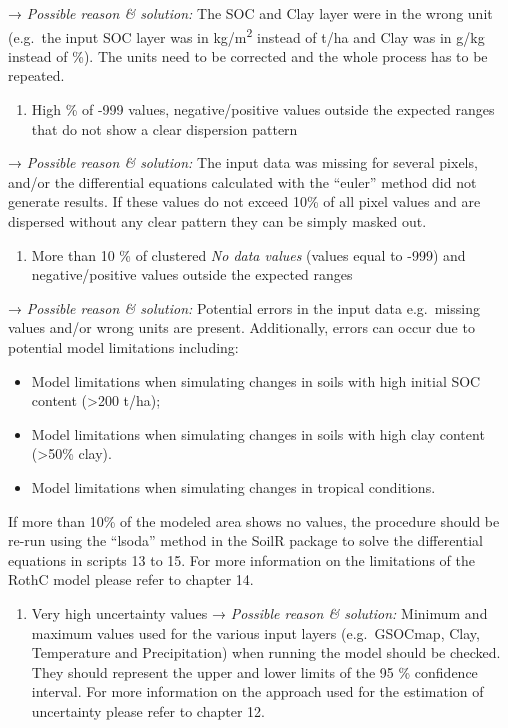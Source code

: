 \documentclass[
  10pt,
  b5paper,
]{book}
\providecommand{\tightlist}{%
  \setlength{\itemsep}{0pt}\setlength{\parskip}{0pt}}
\begin{document}
→ \emph{Possible reason \& solution:} The SOC and Clay layer were in the wrong unit (e.g.~the input SOC layer was in kg/m\textsuperscript{2} instead of t/ha and Clay was in g/kg instead of \%). The units need to be corrected and the whole process has to be repeated.

\begin{enumerate}
\def\labelenumi{\arabic{enumi}.}
\setcounter{enumi}{1}
\tightlist
\item
  High \% of -999 values, negative/positive values outside the expected ranges that do not show a clear dispersion pattern
\end{enumerate}

→ \emph{Possible reason \& solution:} The input data was missing for several pixels, and/or the differential equations calculated with the ``euler'' method did not generate results. If these values do not exceed 10\% of all pixel values and are dispersed without any clear pattern they can be simply masked out.

\begin{enumerate}
\def\labelenumi{\arabic{enumi}.}
\setcounter{enumi}{2}
\tightlist
\item
  More than 10 \% of clustered \emph{No data values} (values equal to -999) and negative/positive values outside the expected ranges
\end{enumerate}

→ \emph{Possible reason \& solution:} Potential errors in the input data e.g.~missing values and/or wrong units are present. Additionally, errors can occur due to potential model limitations including:

\begin{itemize}
\tightlist
\item
  Model limitations when simulating changes in soils with high initial SOC content (\textgreater200 t/ha);
\item
  Model limitations when simulating changes in soils with high clay content (\textgreater50\% clay).
\item
  Model limitations when simulating changes in tropical conditions.
\end{itemize}

If more than 10\% of the modeled area shows no values, the procedure should be re-run using the ``lsoda'' method in the SoilR package to solve the differential equations in scripts 13 to 15. For more information on the limitations of the RothC model please refer to chapter 14.

\begin{enumerate}
\def\labelenumi{\arabic{enumi}.}
\setcounter{enumi}{3}
\tightlist
\item
  Very high uncertainty values
  → \emph{Possible reason \& solution:} Minimum and maximum values used for the various input layers (e.g.~GSOCmap, Clay, Temperature and Precipitation) when running the model should be checked. They should represent the upper and lower limits of the 95 \% confidence interval. For more information on the approach used for the estimation of uncertainty please refer to chapter 12.
\end{enumerate}
\end{document}
